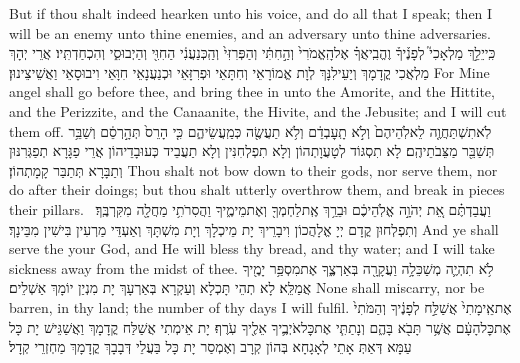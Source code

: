 {But if thou shalt indeed hearken unto his voice, and do all that I speak; then I will be an enemy unto thine enemies, and an adversary unto thine adversaries.}{}
{כִּֽי\maqqaf יֵלֵ֣ךְ מַלְאָכִי֮ לְפָנֶ֒יךָ֒ וֶהֱבִֽיאֲךָ֗ אֶל\maqqaf הָֽאֱמֹרִי֙ וְהַ֣חִתִּ֔י וְהַפְּרִזִּי֙ וְהַֽכְּנַעֲנִ֔י הַחִוִּ֖י וְהַיְבוּסִ֑י וְהִכְחַדְתִּֽיו׃}
{אֲרֵי יְהָךְ מַלְאֲכִי קֳדָמָךְ וְיַעֵילִנָּךְ לְוָת אֱמוֹרָאֵי וְחִתָּאֵי וּפְרִזָּאֵי וּכְנַעֲנָאֵי חִוָּאֵי וִיבוּסָאֵי וַאֲשֵׁיצֵינוּן׃}
{For Mine angel shall go before thee, and bring thee in unto the Amorite, and the Hittite, and the Perizzite, and the Canaanite, the Hivite, and the Jebusite; and I will cut them off.}{}
{לֹֽא\maqqaf תִשְׁתַּחֲוֶ֤ה לֵאלֹֽהֵיהֶם֙ וְלֹ֣א תָֽעׇבְדֵ֔ם וְלֹ֥א תַעֲשֶׂ֖ה כְּמַֽעֲשֵׂיהֶ֑ם כִּ֤י הָרֵס֙ תְּהָ֣רְסֵ֔ם וְשַׁבֵּ֥ר תְּשַׁבֵּ֖ר מַצֵּבֹתֵיהֶֽם׃}
{לָא תִסְגּוֹד לְטָעֲוָתְהוֹן וְלָא תִפְלְחִנִּין וְלָא תַעֲבֵיד כְּעוּבָדֵיהוֹן אֲרֵי פַגָּרָא תְפַגְּרִנּוּן וְתַבָּרָא תְּתַבַּר קָמָתְהוֹן׃}
{Thou shalt not bow down to their gods, nor serve them, nor do after their doings; but thou shalt utterly overthrow them, and break in pieces their pillars.}{}
{וַעֲבַדְתֶּ֗ם אֵ֚ת יְהֹוָ֣ה אֱלֹֽהֵיכֶ֔ם וּבֵרַ֥ךְ אֶֽת\maqqaf לַחְמְךָ֖ וְאֶת\maqqaf מֵימֶ֑יךָ וַהֲסִרֹתִ֥י מַחֲלָ֖ה מִקִּרְבֶּֽךָ׃ \setuma }
{וְתִפְלְחוּן קֳדָם יְיָ אֱלָהֲכוֹן וִיבָרֵיךְ יָת מֵיכְלָךְ וְיָת מִשְׁתָּךְ וְאַעְדֵּי מַרְעִין בִּישִׁין מִבֵּינָךְ׃}
{And ye shall serve the \lord\space your God, and He will bless thy bread, and thy water; and I will take sickness away from the midst of thee.}{}
{לֹ֥א תִהְיֶ֛ה מְשַׁכֵּלָ֥ה וַעֲקָרָ֖ה בְּאַרְצֶ֑ךָ אֶת\maqqaf מִסְפַּ֥ר יָמֶ֖יךָ אֲמַלֵּֽא׃}
{לָא תְהֵי תָּכְלָא וְעַקְרָא בְּאַרְעָךְ יָת מִנְיַן יוֹמָךְ אַשְׁלֵים׃}
{None shall miscarry, nor be barren, in thy land; the number of thy days I will fulfil.}{}
{אֶת\maqqaf אֵֽימָתִי֙ אֲשַׁלַּ֣ח לְפָנֶ֔יךָ וְהַמֹּתִי֙ אֶת\maqqaf כׇּל\maqqaf הָעָ֔ם אֲשֶׁ֥ר תָּבֹ֖א בָּהֶ֑ם וְנָתַתִּ֧י אֶת\maqqaf כׇּל\maqqaf אֹיְבֶ֛יךָ אֵלֶ֖יךָ עֹֽרֶף׃}
{יָת אֵימְתִי אֲשַׁלַּח קֳדָמָךְ וַאֲשַׁגֵּישׁ יָת כָּל עַמָּא דְּאַתְּ אָתֵי לְאָגָחָא בְּהוֹן קְרָב וְאֶמְסַר יָת כָּל בַּעֲלֵי דְּבָבָךְ קֳדָמָךְ מַחְזְרֵי קְדָל׃}
